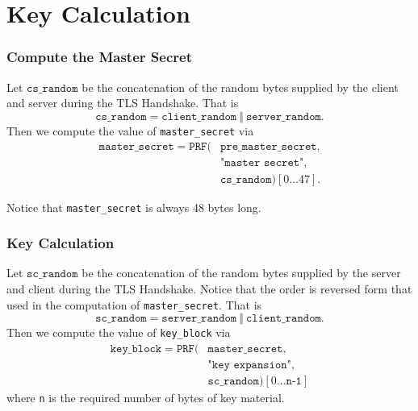 \documentclass[aspectratio=169]{beamer}
\begin{document}
\section{Key Calculation}
\begin{frame}[Roundel=siiorange]
	\tocpage
\end{frame}

\begin{frame}
	\frametitle{Compute the Master Secret}
	Let $\texttt{cs\_random}$ be the concatenation of the random bytes supplied by the client and server during the TLS Handshake. That is
	\begin{equation} \nonumber
	\texttt{cs\_random} = \texttt{client\_random} \ \Vert \ \texttt{server\_random}.
	\end{equation}
	Then we compute the value of \texttt{master\_secret} via
	\begin{align*}
		\texttt{master\_secret} = \texttt{PRF}(&\texttt{pre\_master\_secret},\\
		&\texttt{"master secret"},\\
		&\texttt{cs\_random})[0\ldots 47].
	\end{align*}
	
	\vfill
	
	Notice that \texttt{master\_secret} is always 48 bytes long.
\end{frame}

\begin{frame}
	\frametitle{Key Calculation}
	Let $\texttt{sc\_random}$ be the concatenation of the random bytes supplied by the server and client during the TLS Handshake. Notice that the order is reversed form that used in the computation of \texttt{master\_secret}. That is
	\begin{equation} \nonumber
	\texttt{sc\_random} = \texttt{server\_random} \ \Vert \ \texttt{client\_random}.
	\end{equation}
	Then we compute the value of \texttt{key\_block} via
	\begin{equation} \nonumber
	\begin{split}
		\texttt{key\_block} = \texttt{PRF}(&\texttt{master\_secret}, \\
		&\texttt{"key expansion"},\\
		&\texttt{sc\_random})[0\ldots \texttt{n-1}]
	\end{split}
	\end{equation}
	where \texttt{n} is the required number of bytes of key material.
\end{frame}
\end{document}
